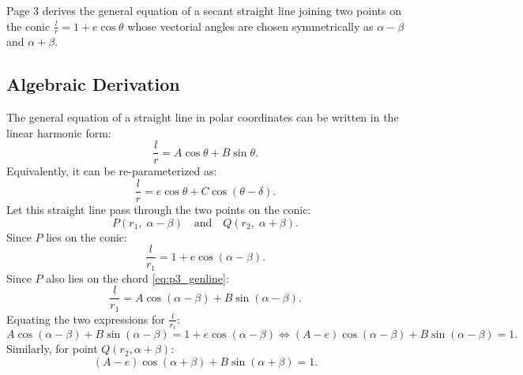 \begin{conceptbox}
Page 3 derives the general equation of a secant straight line joining two points on the conic $\frac{l}{r} = 1 + e\cos\theta$ whose vectorial angles are chosen symmetrically as $\alpha - \beta$ and $\alpha + \beta$.
\end{conceptbox}

\subsection{Algebraic Derivation}
The general equation of a straight line in polar coordinates can be written in the linear harmonic form:
\begin{equation}
    \frac{l}{r} = A\cos\theta + B\sin\theta. \label{eq:p3_genline}
\end{equation}
Equivalently, it can be re-parameterized as:
\begin{equation}
    \frac{l}{r} = e\cos\theta + C\cos(\theta - \delta).
\end{equation}
Let this straight line pass through the two points on the conic:
\begin{equation}
    P\left(r_1, \; \alpha - \beta\right) \quad \text{and} \quad Q\left(r_2, \; \alpha + \beta\right).
\end{equation}
Since $P$ lies on the conic:
\begin{equation}
    \frac{l}{r_1} = 1 + e\cos(\alpha - \beta).
\end{equation}
Since $P$ also lies on the chord \eqref{eq:p3_genline}:
\begin{equation}
    \frac{l}{r_1} = A\cos(\alpha - \beta) + B\sin(\alpha - \beta).
\end{equation}
Equating the two expressions for $\frac{l}{r_1}$:
\begin{equation}
    A\cos(\alpha - \beta) + B\sin(\alpha - \beta) = 1 + e\cos(\alpha - \beta) \iff (A - e)\cos(\alpha - \beta) + B\sin(\alpha - \beta) = 1. \label{eq:p3_eq1}
\end{equation}
Similarly, for point $Q(r_2, \alpha + \beta)$:
\begin{equation}
    (A - e)\cos(\alpha + \beta) + B\sin(\alpha + \beta) = 1. \label{eq:p3_eq2}
\end{equation}


